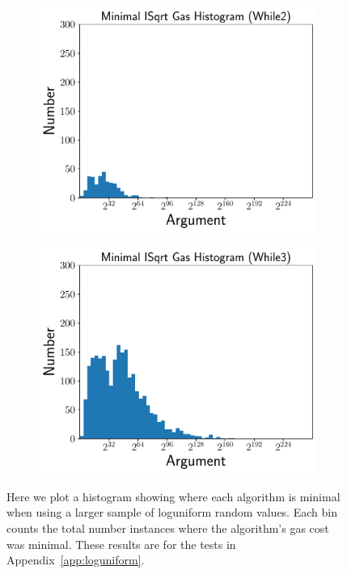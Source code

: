 \begin{figure}[p]
    \begin{subfigure}[t]{0.45\textwidth}
    \includegraphics[width=\textwidth]{plots/minimal_hist_While2_er.pdf}
    \end{subfigure}
    \begin{subfigure}[t]{0.45\textwidth}
    \includegraphics[width=\textwidth]{plots/minimal_hist_While3_er.pdf}
    \end{subfigure}
    \caption{Here we plot a histogram showing where each algorithm is minimal
        when using a larger sample of loguniform random values.
        Each bin counts the total number instances where the algorithm's
        gas cost was minimal.
        These results are for the tests in Appendix~\ref{app:loguniform}.
        }
    \label{fig:minimal_gas_hist_er}
\end{figure}
